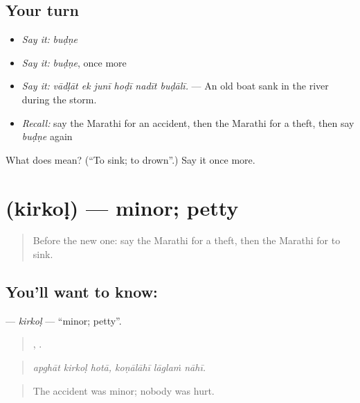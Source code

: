 \subsection*{Your turn}
\begin{itemize}
\raggedright
  \item \emph{Say it:} \emph{buḍṇe}
  \item \emph{Say it:} \emph{buḍṇe}, once more
  \item \emph{Say it:} \emph{vādḷāt ek junī hoḍī nadīt buḍālī.} — An old boat sank in the river during the storm.
  \item \emph{Recall:} say the Marathi for an accident, then the Marathi for a theft, then say \emph{buḍṇe} again
\end{itemize}

\begin{tcolorbox}[breakable,colback=teal!4,colframe=teal!35!black,title={Before you move on}]
What does  mean? (\textquotedblleft{}To sink; to drown\textquotedblright{}.) Say it once more.
\end{tcolorbox}
\section[\texorpdfstring{\mr{किरकोळ} (kirkoḷ)}{किरकोळ (kirkoḷ)}]{ (kirkoḷ) — minor; petty}

\label{lesson:MR-C288-kirkol}



\begin{quote}
Before the new one: say the Marathi for a theft, then the Marathi for to sink.
\end{quote}

\subsection*{You'll want to know: }
\textbf{} — \emph{kirkoḷ} — \textquotedblleft{}minor; petty\textquotedblright{}.

\begin{quote}
  ,   .
\end{quote}

\begin{quote}
\emph{apghāt kirkoḷ hotā, koṇālāhī lāglaṁ nāhī.}
\end{quote}

\begin{quote}
The accident was minor; nobody was hurt.
\end{quote}

